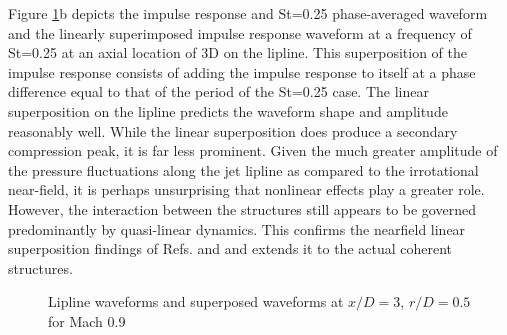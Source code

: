 \documentclass[english]{aiaa-tc}
\begin{document}
Figure \ref{NUM_Phase_AVG_lip}b depicts the impulse response and St=0.25 phase-averaged waveform and the linearly superimposed impulse response waveform at a frequency of St=0.25 at an axial location of 3D on the lipline. This superposition of the impulse response consists of adding the impulse response to itself at a phase difference equal to that of the period of the St=0.25 case.
The linear superposition on the lipline predicts the waveform shape and amplitude reasonably well.
While the linear superposition does produce a secondary compression peak, it is far less prominent. Given the much greater amplitude of the pressure fluctuations along the jet lipline as compared to the irrotational near-field, it is perhaps unsurprising that nonlinear effects play a greater role. However, the interaction between the structures still appears to be governed predominantly by quasi-linear dynamics. This confirms the nearfield linear superposition findings of Refs. \cite{sinha2013} and \cite{Crawley2014} and extends it to the actual coherent structures.
\begin{figure}
	\centering{}\caption{Lipline waveforms and superposed waveforms at $x/D = 3$, $r/D = 0.5$ for Mach 0.9}\label{NUM_Phase_AVG_lip}
\end{figure}
\end{document}

